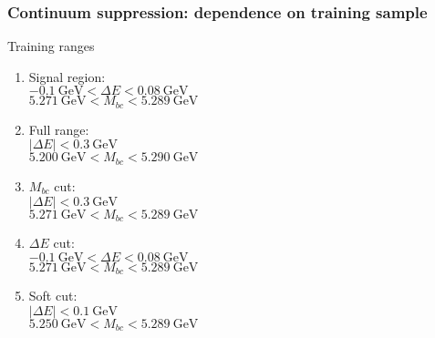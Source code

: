 \documentclass[10 pt,compress,mathserif]{beamer}
\begin{document}
\begin{frame}[containsverbatim]
\frametitle{Continuum suppression: dependence on training sample}
  \begin{block}{Training ranges}
  \begin{small}
   \begin{enumerate}
   \item Signal region:\\
    $-0.1\ \text{GeV}<\Delta E<0.08\ \text{GeV}$\\
    $5.271\ \text{GeV}<M_{bc}<5.289\ \text{GeV}$
   \item Full range:\\
    $\left|\Delta E\right|<0.3\ \text{GeV}$\\
    $5.200\ \text{GeV}<M_{bc}<5.290\ \text{GeV}$
   \item $M_{bc}$ cut:\\
    $\left|\Delta E\right|<0.3\ \text{GeV}$\\
    $5.271\ \text{GeV}<M_{bc}<5.289\ \text{GeV}$
   \item $\Delta E$ cut:\\
    $-0.1\ \text{GeV}<\Delta E<0.08\ \text{GeV}$\\
    $5.271\ \text{GeV}<M_{bc}<5.289\ \text{GeV}$
   \item Soft cut:\\
    $\left|\Delta E\right|<0.1\ \text{GeV}$\\
    $5.250\ \text{GeV}<M_{bc}<5.289\ \text{GeV}$
  \end{enumerate}
  \end{small}
  \end{block}
\end{frame}
\end{document}
